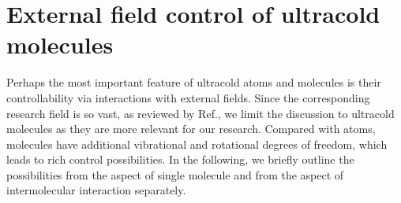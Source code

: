 \section{External field control of ultracold molecules}
\label{sec:control}
Perhaps the most important feature of ultracold atoms and molecules is their controllability via interactions with  
external fields. Since the corresponding research field is so vast, as reviewed by Ref.\cite{lemoshko2013}, 
we  limit the discussion to ultracold molecules as they are more relevant for our research.  
Compared with atoms, molecules have additional vibrational and rotational degrees of freedom, which leads to rich 
control possibilities. In the following, we briefly outline the possibilities from the aspect of single molecule and from
the aspect of intermolecular interaction separately. 

